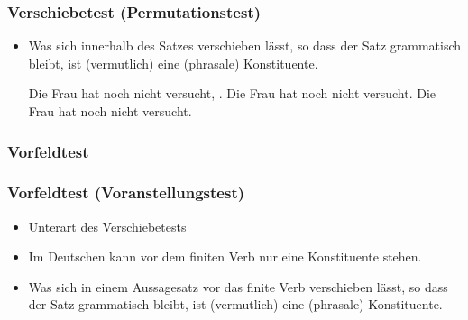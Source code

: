 \begin{frame}
\frametitle{Verschiebetest (Permutationstest)}

\begin{itemize}
	\item Was sich innerhalb des Satzes verschieben lässt, so dass der Satz grammatisch bleibt, ist (vermutlich) eine (phrasale) Konstituente.

	\eal 
	\zl

\pause	
	\eal 
	\ex Die Frau hat noch nicht versucht, .
	\ex Die Frau hat  noch nicht versucht.
	\ex Die Frau hat noch nicht  versucht.
	\zl

\end{itemize}

\nocite{MyP18l}

\end{frame}


\subsubsection{Vorfeldtest}



\begin{frame}
\frametitle{Vorfeldtest (Voranstellungstest)}

\begin{itemize}
	\item Unterart des Verschiebetests
	\medskip
	\item Im Deutschen kann vor dem finiten Verb nur eine Konstituente stehen. 
	\medskip
	\item Was sich in einem Aussagesatz vor das finite Verb verschieben lässt, so dass der Satz grammatisch bleibt, ist (vermutlich) eine (phrasale) Konstituente.

\end{itemize}

\end{frame}


